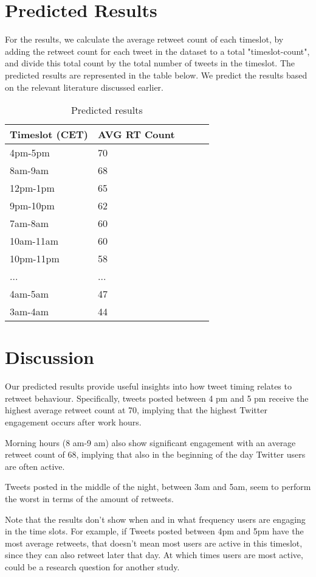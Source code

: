 \documentclass[11pt]{article}
\begin{document}
\section{Predicted Results}
For the results, we calculate the average retweet count of each timeslot, by adding the retweet count for each tweet in the dataset to a total "timeslot-count", and divide this total count by the total number of tweets in the timeslot.
The predicted results are represented in the table below. We predict the results based on the relevant literature discussed earlier.


\begin{table}[hbtp]\centering
\begin{tabular}{p{2cm}p{4cm}p{4cm}p{3cm}p{3cm}}
    \toprule
    Timeslot (CET) & AVG RT Count \\
    \midrule
    4pm-5pm & 70 \\
8am-9am & 68 \\
12pm-1pm & 65 \\
9pm-10pm & 62 \\
7am-8am & 60 \\
10am-11am & 60 \\
10pm-11pm & 58 \\
... & ... \\
4am-5am & 47 \\
3am-4am & 44 \\

    \bottomrule
  \end{tabular}
\caption{Predicted results}
\label{tbl: results}
\end{table}


\section{Discussion}
Our predicted results provide useful insights into how tweet timing relates to retweet behaviour. Specifically, tweets posted between 4 pm and 5 pm receive the highest average retweet count at 70, implying that the highest Twitter engagement occurs after work hours. 

Morning hours (8 am-9 am) also show significant engagement with an average retweet count of 68, implying that also in the beginning of the day Twitter users are often active.

Tweets posted in the middle of the night, between 3am and 5am, seem to perform the worst in terms of the amount of retweets.

Note that the results don't show when and in what frequency users are engaging in the time slots. For example, if Tweets posted between 4pm and 5pm have the most average retweets, that doesn't mean most users are active in this timeslot, since they can also retweet later that day. At which times users are most active, could be a research question for another study.
\end{document}

